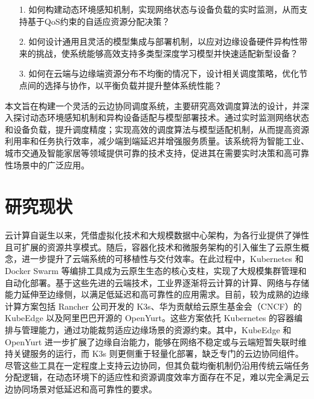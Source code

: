 \begin{enumerate}
    \item[1.] 如何构建动态环境感知机制，实现网络状态与设备负载的实时监测，从而支持基于QoS约束的自适应资源分配决策？
    \item[2.] 如何设计通用且灵活的模型集成与部署机制，以应对边缘设备硬件异构性带来的挑战，使系统能够高效支持多类型深度学习模型并快速适配新型设备？
    \item[3.] 如何在云端与边缘端资源分布不均衡的情况下，设计相关调度策略，优化节点间的选择与协作，以平衡负载并提升整体系统性能？
\end{enumerate}

本文旨在构建一个灵活的云边协同调度系统，主要研究高效调度算法的设计，并深入探讨动态环境感知机制和异构设备适配与模型部署技术。通过实时监测网络状态和设备负载，提升调度精度；实现高效的调度算法与模型适配机制，从而提高资源利用率和任务执行效率，减少端到端延迟并增强服务质量。该系统将为智能工业、城市交通及智能家居等领域提供可靠的技术支持，促进其在需要实时决策和高可靠性场景中的广泛应用。

\section{研究现状}

云计算自诞生以来，凭借虚拟化技术和大规模数据中心架构，为各行业提供了弹性且可扩展的资源共享模式。随后，容器化技术和微服务架构的引入催生了云原生概念，进一步提升了云端系统的可移植性与交付效率\cite{deng2024cloud}。在此过程中，Kubernetes\cite{kubernetes} 和 Docker Swarm\cite{dockerswarm} 等编排工具成为云原生生态的核心支柱，实现了大规模集群管理和自动化部署。基于这些先进的云端技术，工业界逐渐将云计算的计算、网络与存储能力延伸至边缘侧，以满足低延迟和高可靠性的应用需求。目前，较为成熟的边缘计算方案包括 Rancher 公司开发的 K3s\cite{fogli2021performance}、华为贡献给云原生基金会（CNCF）的 KubeEdge\cite{xiong2018extend} 以及阿里巴巴开源的 OpenYurt\cite{openyurt2023}。这些方案依托 Kubernetes 的容器编排与管理能力，通过功能裁剪适应边缘场景的资源约束。其中，KubeEdge 和 OpenYurt 进一步扩展了边缘自治能力，能够在网络不稳定或与云端短暂失联时维持关键服务的运行，而 K3s 则更侧重于轻量化部署，缺乏专门的云边协同组件。尽管这些工具在一定程度上支持云边协同，但其负载均衡机制仍沿用传统云端任务分配逻辑，在动态环境下的适应性和资源调度效率方面存在不足，难以完全满足云边协同场景对低延迟和高可靠性的要求。

